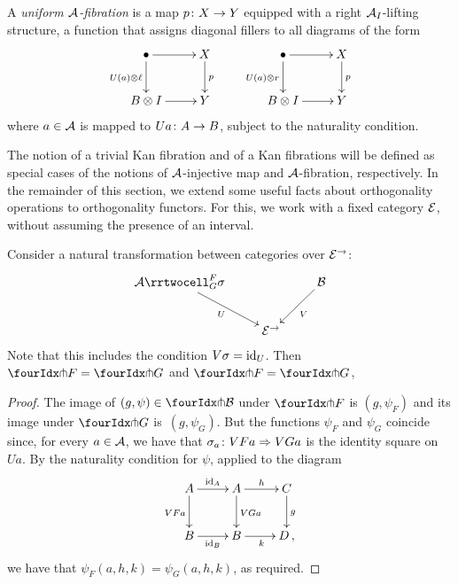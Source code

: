 \documentclass[reqno,10pt,a4paper,oneside]{amsart}
\begin{document}
\begin{definition} A \emph{uniform $\cal{A}$-fibration} is a map $p \co X \to Y$ equipped with a right $\cal{A}_\interval$-lifting structure, \ie a function that assigns diagonal fillers to all diagrams of the form
\[
\xymatrix{
\bullet \ar[r] \ar[d]_{U(a) \otimes \intervall} & X \ar[d]^p \\
B \otimes I \ar[r] & Y} \qquad \xymatrix{
\bullet \ar[r] \ar[d]_{U(a) \otimes \intervalr} & X \ar[d]^p \\
B \otimes I \ar[r] & Y}
\]
where $a \in \cal{A}$ is mapped to $Ua \co A \to B$, subject to the naturality condition.
\end{definition}

The notion of a trivial Kan fibration and of a Kan fibrations will be defined as special cases of the notions of
$\cal{A}$-injective map and $\cal{A}$-fibration, respectively. In the remainder of this section, we extend some useful facts about orthogonality operations to orthogonality functors. For this, we work with a fixed category $\catE$, without
assuming the presence of an interval. 


\begin{proposition}
Consider a natural transformation between categories over $\catE^{\to}$:
\[
\xymatrix{
  \cal{A}
  \rrtwocell_G^F{\sigma}
 \ar[dr]_{U}
&&
  \cal{B}
  \ar[dl]^{V}
\\&
  \catE^{\to}
}
\]
Note that this includes the condition $V \sigma = \id_U$.
Then $\liftr{F} = \liftr{G}$ and $\liftl{F} = \liftl{G}$, 
\end{proposition}

\begin{proof} The image of $(g, \psi) \in \liftr{\cal{B}}$ under $\liftr{F}$ is $(g, \psi_F)$ and its
image under $\liftr{G}$ is~$(g, \psi_G)$. But the functions $\psi_F$ and $\psi_G$ coincide since, for
every $a \in \cal{A}$, we have that $\sigma_a \co VFa \Rightarrow VGa$ is the identity square on $Ua$. 
By the naturality condition for $\psi$, applied to the diagram 
\[
\xymatrix{
A \ar[r]^{\id_A} \ar[d]_{VFa}  & A \ar[d]^{VGa} \ar[r]^{h}  & C \ar[d]^g \\
B \ar[r]_{\id_B} & B \ar[r]_{k} & D \, ,}
\]
we have  that $\psi_F(a, h, k) = \psi_G(a, h, k)$, as required.
\end{proof} 
\end{document}
